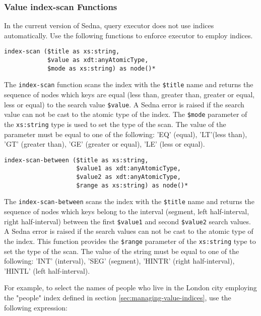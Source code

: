 \documentclass[a4paper,12pt]{article}
\begin{document}
\subsubsection{Value index-scan Functions}
\label{sec:value-index-scan-fun}

In the current version of Sedna, query executor does not use indices
automatically. Use the following functions to enforce executor to employ
indices.

\begin{verbatim}
index-scan ($title as xs:string,
            $value as xdt:anyAtomicType,
            $mode as xs:string) as node()*
\end{verbatim}

The \verb!index-scan! function scans the index with the \verb!$title! name and
returns the sequence of nodes which keys are equal (less than, greater than,
greater or equal, less or equal) to the search value \verb!$value!. A Sedna
error is raised if the search value can not be cast to the atomic type of the
index. The \verb!$mode! parameter of the \verb!xs:string! type is used to set
the type of the scan. The value of the parameter must be equal to one of the
following: 'EQ' (equal), 'LT'(less than), 'GT' (greater than), 'GE' (greater or
equal), 'LE' (less or equal).

\begin{verbatim}
index-scan-between ($title as xs:string,
                    $value1 as xdt:anyAtomicType,
                    $value2 as xdt:anyAtomicType,
                    $range as xs:string) as node()*
\end{verbatim}

The \verb!index-scan-between! scans the index with the \verb!$title! name and
returns the sequence of nodes which keys belong to the interval (segment, left
half-interval, right half-interval) between the first \verb!$value1! and second
\verb!$value2! search values. A Sedna error is raised if the search values can
not be cast to the atomic type of the index. This function provides the
\verb!$range! parameter of the \verb!xs:string! type to set the type of the
scan. The value of the string must be equal to one of the following: 'INT'
(interval), 'SEG' (segment), 'HINTR' (right half-interval), 'HINTL' (left
half-interval).

For example, to select the names of people who live in the London city employing
the "people" index defined in section \ref{sec:managing-value-indices}, use the
following expression:
\end{document}
